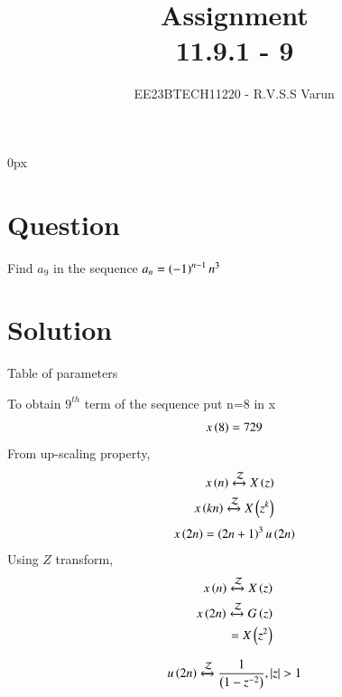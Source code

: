 \documentclass[beamer]{IEEEtran}
\theoremstyle{remark}
\begin{document}
\parindent 0px


\title{Assignment\\[1ex]11.9.1 - 9}
\author{EE23BTECH11220 - R.V.S.S Varun$^{}$%
}
\maketitle
\newpage
\bigskip

\renewcommand{\thefigure}{\theenumi}
\renewcommand{\thetable}{\theenumi}
\section*{Question}
Find $a_{9}$ in the sequence $a_{n}=\left(-1\right)^{n-1}n^{3}$ 
\section*{Solution}
 
\begin{table}[h]
    \centering
   
    
    \caption{Table of parameters}
    \label{tab:11.9.1.9.1}
\end{table}


To obtain $9^{th}$ term of the sequence put n=8 in x
\begin{align}
x\left(8\right)=729
\end{align}
From up-scaling property,
\begin{align}
x\left(n\right)\xleftrightarrow{\mathcal{Z}} X\left(z\right) \\
x\left(kn\right)\xleftrightarrow{\mathcal{Z}} X\left(z^k\right)
\end{align}
\begin{align}
	x\left(2n\right)=\left(2n+1\right)^{3}u\left(2n\right)
\end{align}
Using  $Z$ transform,
\begin{align}
	x\left(n\right)\xleftrightarrow{\mathcal{Z}}X\left(z\right)\\
	x\left(2n\right)\xleftrightarrow{\mathcal{Z}}G\left(z\right)\\
	=X\left(z^2\right)
\end{align}


\begin{align}
	u\left(2n\right)\xleftrightarrow{\mathcal{Z}}\frac{1}{\left(1-z^{-2}\right)},\left\vert z\right\vert>1 
\end{align}
\end{document}
